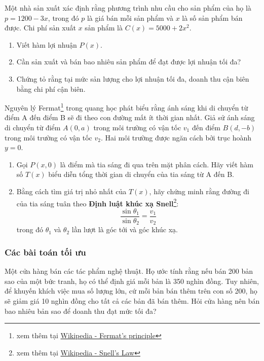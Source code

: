 \begin{exercise}
Một nhà sản xuất xác định rằng phương trình nhu cầu cho sản phẩm của họ là $p = 1200 - 3x$, trong đó $p$ là giá bán mỗi sản phẩm và $x$ là số sản phẩm bán được. Chi phí sản xuất $x$ sản phẩm là $C(x) = 5000 + 2x^2$.
\begin{enumerate}[label=(\alph*)]
    \item Viết hàm lợi nhuận $P(x)$.
    \item Cần sản xuất và bán bao nhiêu sản phẩm để đạt được lợi nhuận tối đa?
    \item Chứng tỏ rằng tại mức sản lượng cho lợi nhuận tối đa, doanh thu cận biên bằng chi phí cận biên.
\end{enumerate}
\end{exercise}

\begin{exercise}
Nguyên lý Fermat\footnote{xem thêm tại \href{https://en.wikipedia.org/wiki/Fermat's_principle}{Wikipedia - Fermat's principle}} trong quang học phát biểu rằng ánh sáng khi di chuyển từ điểm A đến điểm B sẽ đi theo con đường mất ít thời gian nhất. Giả sử ánh sáng di chuyển từ điểm $A(0, a)$ trong môi trường có vận tốc $v_1$ đến điểm $B(d, -b)$ trong môi trường có vận tốc $v_2$. Hai môi trường được ngăn cách bởi trục hoành $y=0$.
\begin{enumerate}[label=(\alph*)]
    \item Gọi $P(x, 0)$ là điểm mà tia sáng đi qua trên mặt phân cách. Hãy viết hàm số $T(x)$ biểu diễn tổng thời gian di chuyển của tia sáng từ A đến B.
    \item Bằng cách tìm giá trị nhỏ nhất của $T(x)$, hãy chứng minh rằng đường đi của tia sáng tuân theo \textbf{Định luật khúc xạ Snell}\footnote{xem thêm tại \href{https://en.wikipedia.org/wiki/Snell's_law}{Wikipedia - Snell's Law}}:
    $$ \dfrac{\sin \theta_1}{\sin \theta_2} = \dfrac{v_1}{v_2} $$
    trong đó $\theta_1$ và $\theta_2$ lần lượt là góc tới và góc khúc xạ.
\end{enumerate}
\end{exercise}

\subsubsection{Các bài toán tối ưu}

\begin{exercise}
Một cửa hàng bán các tác phẩm nghệ thuật. Họ ước tính rằng nếu bán 200 bản sao của một bức tranh, họ có thể định giá mỗi bản là 350 nghìn đồng. Tuy nhiên, để khuyến khích việc mua số lượng lớn, cứ mỗi bản bán thêm trên con số 200, họ sẽ giảm giá 10 nghìn đồng cho tất cả các bản đã bán thêm. Hỏi cửa hàng nên bán bao nhiêu bản sao để doanh thu đạt mức tối đa?
\end{exercise}

